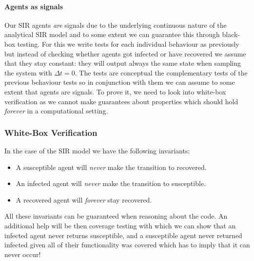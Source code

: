 \paragraph{Agents as signals}
Our SIR agents \textit{are} signals due to the underlying continuous nature of the analytical SIR model and to some extent we can guarantee this through black-box testing. For this we write tests for each individual behaviour as previously but instead of checking whether agents got infected or have recovered we assume that they stay constant: they will output always the same state when sampling the system with $\Delta t = 0$. The tests are conceptual the complementary tests of the previous behaviour tests so in conjunction with them we can assume to some extent that agents are signals. To prove it, we need to look into white-box verification as we cannot make guarantees about properties which should hold \textit{forever} in a computational setting.

\subsubsection{White-Box Verification}

In the case of the SIR model we have the following invariants: 
\begin{itemize}
	\item A susceptible agent will \textit{never} make the transition to recovered.
	\item An infected agent will \textit{never} make the transition to susceptible.
	\item A recovered agent will \textit{forever} stay recovered.
\end{itemize}

All these invariants can be guaranteed when reasoning about the code. An additional help will be then coverage testing with which we can show that an infected agent never returns susceptible, and a susceptible agent never returned infected given all of their functionality was covered which has to imply that it can never occur!


